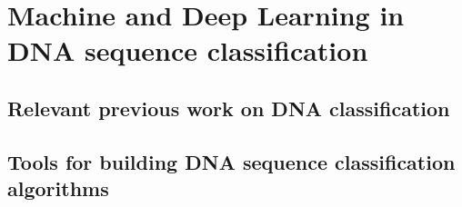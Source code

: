 \chapter{Machine and Deep Learning in DNA sequence classification} \label{sec:ml_dl_dna}

\section{Relevant previous work on DNA classification}



\section{Tools for building DNA sequence classification algorithms}

